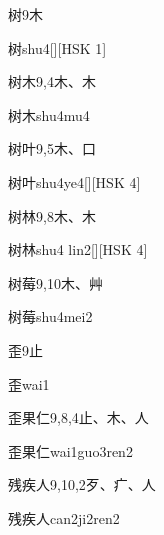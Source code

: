 \begin{entry}{树}{9}{⽊}
  \begin{phonetics}{树}{shu4}[][HSK 1]
  \end{phonetics}
\end{entry}

\begin{entry}{树木}{9,4}{⽊、⽊}
  \begin{phonetics}{树木}{shu4mu4}
  \end{phonetics}
\end{entry}

\begin{entry}{树叶}{9,5}{⽊、⼝}
  \begin{phonetics}{树叶}{shu4ye4}[][HSK 4]
  \end{phonetics}
\end{entry}

\begin{entry}{树林}{9,8}{⽊、⽊}
  \begin{phonetics}{树林}{shu4 lin2}[][HSK 4]
  \end{phonetics}
\end{entry}

\begin{entry}{树莓}{9,10}{⽊、⾋}
  \begin{phonetics}{树莓}{shu4mei2}
  \end{phonetics}
\end{entry}

\begin{entry}{歪}{9}{⽌}
  \begin{phonetics}{歪}{wai1}
  \end{phonetics}
\end{entry}

\begin{entry}{歪果仁}{9,8,4}{⽌、⽊、⼈}
  \begin{phonetics}{歪果仁}{wai1guo3ren2}
  \end{phonetics}
\end{entry}

\begin{entry}{残疾人}{9,10,2}{⽍、⽧、⼈}
  \begin{phonetics}{残疾人}{can2ji2ren2}
  \end{phonetics}
\end{entry}


